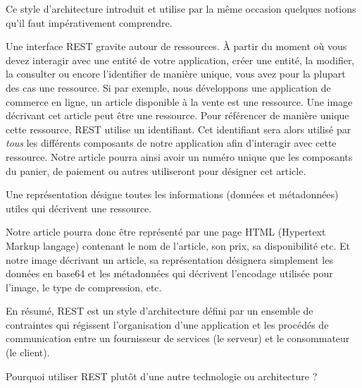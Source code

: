 \documentclass[big]{zmdocument}
\begin{document}


Ce style d'architecture introduit et utilise par la même occasion quelques notions qu'il faut impérativement comprendre.





Une interface REST gravite autour de ressources. À partir du moment où vous devez interagir avec une entité de votre application, créer une entité, la modifier, la consulter ou encore l'identifier de manière unique, vous avez pour la plupart des cas une ressource.
Si par exemple, nous développons une application de commerce en ligne, un article disponible à la vente est une ressource. Une image décrivant cet article peut être une ressource. 
Pour référencer de manière unique cette ressource, REST utilise un identifiant. Cet identifiant sera alors utilisé par \textit{tous} les différents composants de notre application afin d'interagir avec cette ressource.
Notre article pourra ainsi avoir un numéro unique que les composants du panier, de paiement ou autres utiliseront pour désigner cet article.





Une représentation désigne toutes les informations (données et métadonnées) utiles qui décrivent une ressource.



Notre article pourra donc être représenté par une page HTML (Hypertext Markup langage) contenant le nom de l'article, son prix, sa disponibilité etc. Et notre image décrivant un article, sa représentation désignera simplement les données en base64 et les métadonnées qui décrivent l'encodage utilisée pour l'image, le type de compression, etc.



\begin{Information}
En résumé, REST est un style d'architecture défini par un ensemble de contraintes qui régissent l'organisation d'une application et les procédés de communication entre un fournisseur de services (le serveur) et le consommateur (le client).
\end{Information}




\begin{Question}
Pourquoi utiliser REST plutôt d'une autre technologie ou architecture ?
\end{Question}
\end{document}
